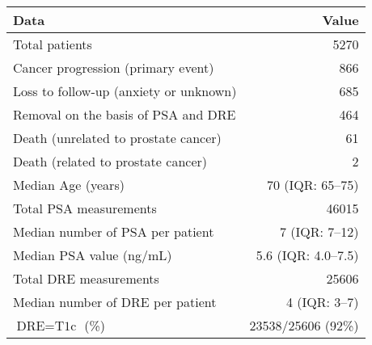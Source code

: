 \begin{table}
\captionsetup{justification=justified}
\small\sf\centering

\label{Table1}
\begin{tabular}{lr}
\toprule
Data & Value\\
\midrule
Total patients & 5270\\
Cancer progression (primary event) & 866\\
Loss to follow-up (anxiety or unknown) & 685\\
Removal on the basis of PSA and DRE & 464\\
Death (unrelated to prostate cancer) & 61\\
Death (related to prostate cancer) & 2\\
\midrule
Median Age (years) & 70 (IQR: 65--75)\\
Total PSA measurements & 46015\\
Median number of PSA per patient &  7 (IQR: 7--12)\\
Median PSA value (ng/mL) & 5.6 (IQR: 4.0--7.5)\\
Total DRE measurements & 25606\\
Median number of DRE per patient & 4 (IQR: 3--7)\\
$\mbox{DRE} = \mbox{T1c}$ (\%) & 23538/25606 (92\%) \\
\bottomrule
\end{tabular}
\end{table}